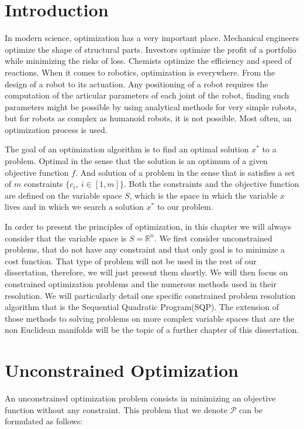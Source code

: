 \section{Introduction}
In modern science, optimization has a very important place.
Mechanical engineers optimize the shape of structural parts.
Investors optimize the profit of a portfolio while minimizing the risks of loss.
Chemists optimize the efficiency and speed of reactions.
When it comes to robotics, optimization is everywhere.
From the design of a robot to its actuation.
Any positioning of a robot requires the computation of the articular parameters of each joint of the robot, finding such parameters might be possible by using analytical methods for very simple robots, but for robots as complex as humanoid robots, it is not possible.
Most often, an optimization process is used.

The goal of an optimization algorithm is to find an optimal solution $x^*$ to a problem.
Optimal in the sense that the solution is an optimum of a given objective function $f$.
And solution of a problem in the sense that is satisfies a set of $m$ constraints $\{c_i,\ i\in [1,m]\}$.
Both the constraints and the objective function are defined on the variable space $\mathit{S}$, which is the space in which the variable $x$ lives and in which we search a solution $x^*$ to our problem.

In order to present the principles of optimization, in this chapter we will always consider that the variable space is $\mathit{S}=\mathbb{R}^n$.
We first consider unconstrained problems, that do not have any constraint and that only goal is to minimize a cost function.
That type of problem will not be used in the rest of our dissertation, therefore, we will just present them shortly.
We will then focus on constrained optimization problems and the numerous methods used in their resolution.
We will particularly detail one specific constrained problem resolution algorithm that is the Sequential Quadratic Program(SQP).
The extension of those methods to solving problems on more complex variable spaces that are the non Euclidean manifolds will be the topic of a further chapter of this dissertation.

\section{Unconstrained Optimization}

An unconstrained optimization problem consists in minimizing an objective function without any constraint.
This problem that we denote $\mathcal{P}$ can be formulated as follows:

